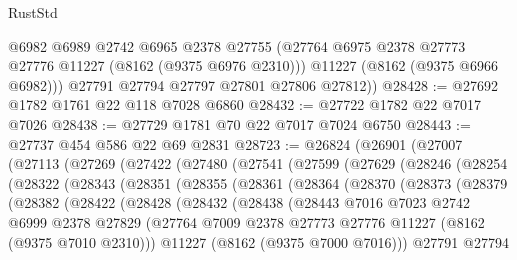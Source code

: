 \begin{lexlean}{RustStd}
\begin{coremodule}
          @6982
          @6989
          @2742
          @6965
          @2378
          @27755
          (@27764 @6975 @2378 @27773 @27776 @11227 (@8162 (@9375 @6976 @2310)))
          @11227
          (@8162 (@9375 @6966 @6982)))
        @27791
        @27794
        @27797
        @27801
        @27806
        @27812))
@28428 := @27692 @1782 @1761 @22 @118 @7028 @6860
@28432 := @27722 @1782 @22 @7017 @7026
@28438 := @27729 @1781 @70 @22 @7017 @7024 @6750
@28443 := @27737 @454 @586 @22 @69 @2831
@28723 := @26824
    (@26901
      (@27007
        (@27113
          (@27269
            (@27422
              (@27480
                (@27541
                  (@27599
                    (@27629
                      (@28246
                        (@28254
                          (@28322
                            (@28343
                              (@28351
                                (@28355
                                  (@28361
                                    (@28364
                                      (@28370
                                        (@28373
                                          (@28379
                                            (@28382
                                              (@28422
                                                (@28428
                                                  (@28432
                                                    (@28438
                                                      (@28443
                                                        @7016
                                                        @7023
                                                        @2742
                                                        @6999
                                                        @2378
                                                        @27829
                                                        (@27764
                                                          @7009
                                                          @2378
                                                          @27773
                                                          @27776
                                                          @11227
                                                          (@8162 (@9375 @7010 @2310)))
                                                        @11227
                                                        (@8162 (@9375 @7000 @7016)))
                                                      @27791
                                                      @27794

\end{coremodule}
\end{lexlean}
